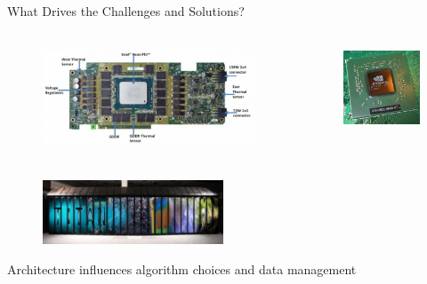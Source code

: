 \documentclass[xcolor=x11names,compress]{beamer}
\renewcommand{\(}{\begin{columns}}
\renewcommand{\)}{\end{columns}}
\newcommand{\<}[1]{\begin{column}{#1}}
\renewcommand{\>}{\end{column}}
\begin{document}
\begin{frame}{What Drives the Challenges and Solutions?}
    
    \begin{columns}
    \begin{column}{0.3\textwidth}
 	   \begin{center}
 	   \begin{figure}     
 	   \includegraphics[height=1.25in,clip]{../figs/Intel-Xeon-Phi-Board}
 	   \end{figure}
 	   \end{center}
    \end{column}
 	\begin{column}{0.8\textwidth}
 	   \begin{center}
 	   \begin{figure} 
 	   \includegraphics[height=1in,clip]{../figs/GPU}
       \end{figure}
 	   \end{center}
  	\end{column}
	\end{columns}
	
	\begin{center}
 	\begin{figure}
 	\includegraphics[height=0.75in,clip]{../figs/Titan}
    \end{figure}
 	\end{center}
 	
 	\alert{Architecture} influences algorithm choices and data management
	
\end{frame}
\end{document}

